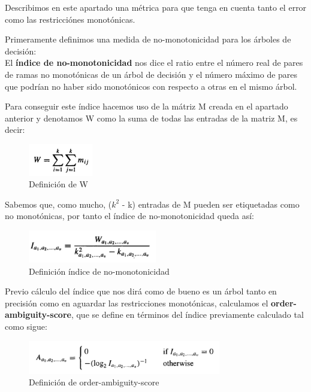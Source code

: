 Describimos en este apartado una métrica para que tenga en cuenta tanto el error como las restricciónes monotónicas.

Primeramente definimos una medida de no-monotonicidad para los árboles de decisión:\\
El \textbf{índice de no-monotonicidad} nos dice el ratio entre el número real de pares de ramas no monotónicas de un árbol de decisión y el número máximo de pares que podrían no haber sido monotónicos con respecto a otras en el mismo árbol.

Para conseguir este índice hacemos uso de la mátriz M creada en el apartado anterior y denotamos W como la suma de todas las entradas de la matriz M, es decir:

\begin{figure}[H]
	\centering
	\includegraphics[width=0.25\textwidth]{imagenes/wsum} 
	\caption{Definición de W \cite{ref14}}
\end{figure}

Sabemos que, como mucho, ($k^2$ - k) entradas de M pueden ser etiquetadas como no monotónicas, por tanto el índice de no-monotonicidad queda así:

\begin{figure}[H]
	\centering
	\includegraphics[width=0.5\textwidth]{imagenes/inm} 
	\caption{Definición índice de no-monotonicidad \cite{ref14}}
\end{figure}

Previo cálculo del índice que nos dirá como de bueno es un árbol tanto en precisión como en aguardar las restricciones monotónicas, calculamos el \textbf{order-ambiguity-score}, que se define en términos del índice previamente calculado tal como sigue:

\begin{figure}[H]
	\centering
	\includegraphics[width=0.75\textwidth]{imagenes/oas} 
	\caption{Definición de order-ambiguity-score \cite{ref14}}
\end{figure}

